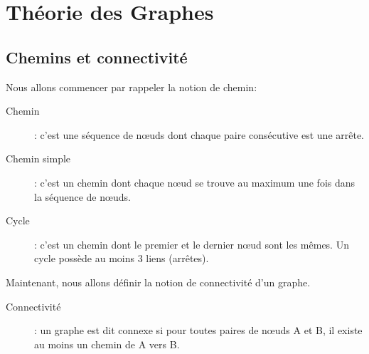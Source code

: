 \section{Théorie des Graphes}


\subsection{Chemins et connectivité}
Nous allons commencer par rappeler la notion de chemin:
	\begin{description}
	\item[Chemin]: c'est une séquence de n\oe uds dont chaque paire consécutive est une arrête.
    \item[Chemin simple]: c'est un chemin dont chaque n\oe ud se trouve au maximum une fois dans la séquence de n\oe uds.
    \item[Cycle]: c'est un chemin dont le premier et le dernier n\oe ud sont les mêmes. Un cycle possède au moins 3 liens (arrêtes).\\
	\end{description}

Maintenant, nous allons définir la notion de connectivité d'un graphe.
	\begin{description}
    \item[Connectivité]: un graphe est dit connexe si pour toutes paires de n\oe uds A et B, il existe au moins un chemin de A vers B.\\
	\end{description}

